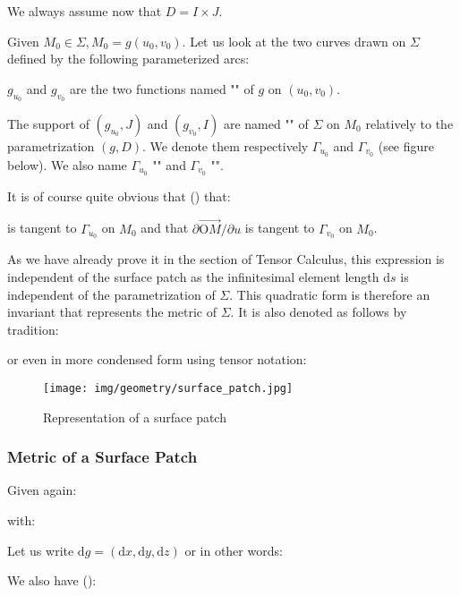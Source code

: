 {	\begin{tcolorbox}[title=Remark,colframe=black,arc=10pt]
	We always assume now that $D=I\times J$.
	\end{tcolorbox}
	Given $M_0 \in \Sigma, M_0=g(u_0,v_0)$. Let us look at the two curves drawn on $\Sigma$ defined by the following parameterized arcs:
	
	$g_{u_0}$ and $g_{v_0}$ are the two functions named "" of $g$ on $(u_0,v_0)$.
	
	The support of $(g_{u_0},J)$ and $(g_{v_0},I)$ are named "" of $\Sigma$ on $M_0$ relatively to the parametrization $(g,D)$. We denote them  respectively $\Gamma_{u_0}$ and $\Gamma_{v_0}$ (see figure below). We also name $\Gamma_{u_0}$ "" and $\Gamma_{v_0}$ "".
	
	It is of course quite obvious that () that:
	
	is tangent to $\Gamma_{u_0}$ on $M_0$ and that $\partial \overrightarrow{\text{O}M}/\partial u$ is tangent to $\Gamma_{v_0}$ on $M_0$.
	
	As we have already prove it in the section of Tensor Calculus, this expression is independent of the surface patch as the infinitesimal  element length $\mathrm{d}s$ is independent of the parametrization of $\Sigma$. This quadratic form is therefore an invariant that represents the metric of $\Sigma$. It is also denoted as follows by tradition:
	
	or even in more condensed form using tensor notation:
	
	
	\begin{figure}[H]
		\centering
		\texttt{[image: img/geometry/surface\_patch.jpg]}
		\caption{Representation of a surface patch}
	\end{figure}
	
	\subsubsection{Metric of a Surface Patch}
	Given again:
	
	with:
	
	Let us write $\mathrm{d}g=(\mathrm{d}x,\mathrm{d}y,\mathrm{d}z)$ or in other words:
	
	We also have ():
	
}
